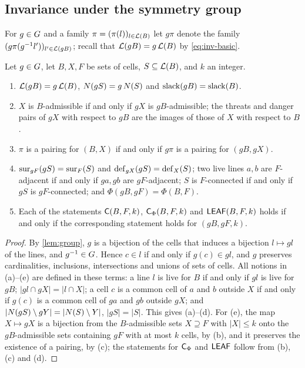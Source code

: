\subsection{Invariance under the symmetry group}\label{ssec:invariance}

For $g\in G$ and a family $\pi=(\pi(l))_{l\in\mathcal{L}(B)}$ let $g\pi$ denote the family
$(g\pi(g^{-1}l'))_{l'\in\mathcal{L}(gB)}$; recall that $\mathcal{L}(gB)=g\,\mathcal{L}(B)$ by \eqref{eq:inv-basic}.

\begin{lemma}[Invariance]\label{lem:invariance}
Let $g\in G$, let $B,X,F$ be sets of cells, $S\subseteq\mathcal{L}(B)$, and $k$ an integer.
\begin{enumerate}[label=\textup{(\alph*)}]
\item $\mathcal{L}(gB)=g\,\mathcal{L}(B)$, $N(gS)=g\,N(S)$ and $\operatorname{slack}(gB)=\operatorname{slack}(B)$.
\item $X$ is $B$-admissible if and only if $gX$ is $gB$-admissible; the threats and danger pairs of $gX$
      with respect to $gB$ are the images of those of $X$ with respect to $B$.
\item $\pi$ is a pairing for $(B,X)$ if and only if $g\pi$ is a pairing for $(gB,gX)$.
\item $\operatorname{sur}_{gF}(gS)=\operatorname{sur}_F(S)$ and $\operatorname{def}_{gX}(gS)=\operatorname{def}_X(S)$; two live lines $a,b$ are $F$-adjacent if and
      only if $ga,gb$ are $gF$-adjacent; $S$ is $F$-connected if and only if $gS$ is $gF$-connected; and
      $\Phi(gB,gF)=\Phi(B,F)$.
\item Each of the statements $\mathsf{C}(B,F,k)$, $\mathsf{C}_\Phi(B,F,k)$ and $\mathsf{LEAF}(B,F,k)$ holds if and only if the
      corresponding statement holds for $(gB,gF,k)$.
\end{enumerate}
\end{lemma}

\begin{proof}
By \cref{lem:group}, $g$ is a bijection of the cells that induces a bijection $l\mapsto gl$ of the lines,
and $g^{-1}\in G$. Hence $c\in l$ if and only if $g(c)\in gl$, and $g$ preserves cardinalities,
inclusions, intersections and unions of sets of cells. All notions in (a)--(e) are defined in these
terms: a line $l$ is live for $B$ if and only if $gl$ is live for $gB$; $|gl\cap gX|=|l\cap X|$; a cell
$c$ is a common cell of $a$ and $b$ outside $X$ if and only if $g(c)$ is a common cell of $ga$ and $gb$
outside $gX$; and $|N(gS)\setminus gY|=|N(S)\setminus Y|$, $|gS|=|S|$. This gives (a)--(d). For (e), the
map $X\mapsto gX$ is a bijection from the $B$-admissible sets $X\supseteq F$ with $|X|\le k$ onto the
$gB$-admissible sets containing $gF$ with at most $k$ cells, by (b), and it preserves the existence of
a pairing, by (c); the statements for $\mathsf{C}_\Phi$ and $\mathsf{LEAF}$ follow from (b), (c) and (d).
\end{proof}
